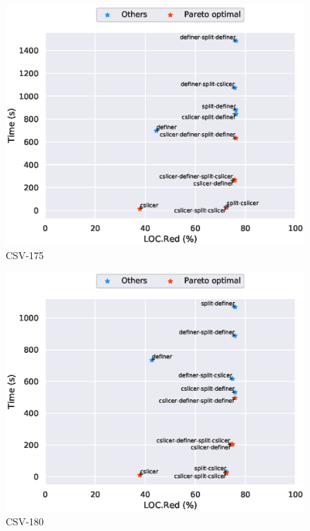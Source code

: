 \begin{figure}
\includegraphics[scale=0.7]{plots/pareto/CSV-175-pareto}
\caption{CSV-175}
\end{figure}
\begin{figure}
\includegraphics[scale=0.7]{plots/pareto/CSV-180-pareto}
\caption{CSV-180}
\end{figure}
